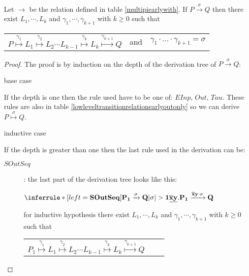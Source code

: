 \begin{proposition}\label{equivalencehightolow}
  Let $\rightarrow$ be the relation defined in table \ref{multipiearlywith}. If $P\xrightarrow{\sigma} Q$ then there exist $L_{1}, \cdots, L_{k}$ and $\gamma_{1}, \cdots, \gamma_{k+1}$ with $k\geq 0$ such that 
  \begin{center}
    \begin{tabular}{lll}
      $P \stackrel{\gamma_{1}}{\longmapsto} L_{1} \stackrel{\gamma_{2}}{\longmapsto} L_{2} \cdots L_{k-1} \stackrel{\gamma_{k}}{\longmapsto} L_{k} \stackrel{\gamma_{k+1}}{\longmapsto} Q$ 
    &
      and
    &
      $\gamma_{1} \cdot \ldots \cdot \gamma_{k+1} = \sigma$  
    \end{tabular}
  \end{center}
  \begin{proof}
    The proof is by induction on the depth of the derivation tree of $P\xrightarrow{\sigma} Q$:
    \begin{description}
      \item[base case]
    \end{description}
	If the depth is one then the rule used have to be one of: $EInp$, $Out$, $Tau$. These rules are also in table \ref{lowleveltransitionrelationearlyoutonly} so we can derive $P \stackrel{\sigma}{\longmapsto}Q$.
    \begin{description}
      \item[inductive case]
    \end{description}
	If the depth is greater than one then the last rule used in the derivation can be:
	\begin{description}
	  \item[$SOutSeq$]: 
	    the last part of the derivation tree looks like this:
	    \begin{center}
	      $\inferrule* [left=\bf{SOutSeq}]{
		  P_{1} \xrightarrow{\sigma} Q
		\\
		  |\sigma|>1
	      }{
		\underline{\overline{x}y}.P_{1} \xrightarrow{\overline{x}y \cdot \sigma} Q
	      }$	      
	    \end{center}
	    for inductive hypothesis there exist $L_{1}, \cdots, L_{k}$ and $\gamma_{1}, \cdots, \gamma_{k+1}$ with $k\geq 0$ such that 
	    \begin{center}
	      \begin{tabular}{lll}
		$P_{1} \stackrel{\gamma_{1}}{\longmapsto} L_{1} \stackrel{\gamma_{2}}{\longmapsto} L_{2} \cdots L_{k-1} \stackrel{\gamma_{k}}{\longmapsto} L_{k} \stackrel{\gamma_{k+1}}{\longmapsto} Q$ 

\end{tabular}
\end{center}
\end{description}
\end{proof}
\end{proposition}
